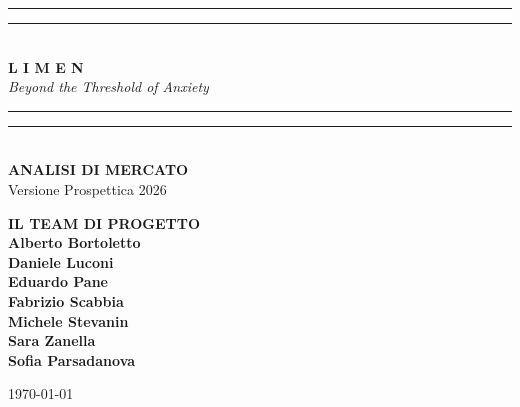 \documentclass[12pt,a4paper]{article}
\begin{document}
\begin{titlepage}
    \centering
    \vspace*{1cm}
    
    \rule{\textwidth}{1.6pt}\vspace*{-\baselineskip}\vspace*{2pt}
    \rule{\textwidth}{0.4pt}\\[\baselineskip]
    
    {\Huge \textbf{\color{LimenDeep} L I M E N}} \\
    \vspace{0.5cm}
    {\Large \textit{Beyond the Threshold of Anxiety}} \\
    
    \rule{\textwidth}{0.4pt}\vspace*{-\baselineskip}\vspace*{2pt}
    \rule{\textwidth}{1.6pt}\\[2cm]
    
    {\Large \textbf{ANALISI DI MERCATO}} \\
    \vspace{0.5cm}
    {\large Versione Prospettica 2026} \\
    
    \vfill

    \begin{minipage}{0.8\textwidth}
        \centering
        \textbf{\large IL TEAM DI PROGETTO} \\
        \vspace{0.5cm}
            \textbf{Alberto Bortoletto} \\
            \textbf{Daniele Luconi} \\
            \textbf{Eduardo Pane} \\
            \textbf{Fabrizio Scabbia} \\
            \textbf{Michele Stevanin} \\
            \textbf{Sara Zanella} \\            
            \textbf{Sofia Parsadanova} \\
    \end{minipage}

    \vfill
    {\large \today}
\end{titlepage}

\newpage
\tableofcontents
\newpage

\end{document}
